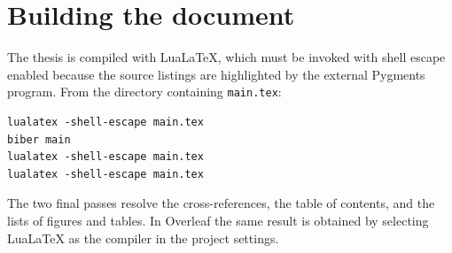 \section{Building the document}\label{app:building}

The thesis is compiled with LuaLaTeX, which must be invoked with shell escape enabled because the source listings are highlighted by the external Pygments program. From the directory containing \texttt{main.tex}:

\begin{verbatim}
lualatex -shell-escape main.tex
biber main
lualatex -shell-escape main.tex
lualatex -shell-escape main.tex
\end{verbatim}

\noindent
The two final passes resolve the cross-references, the table of contents, and the lists of figures and tables. In Overleaf the same result is obtained by selecting LuaLaTeX as the compiler in the project settings.
